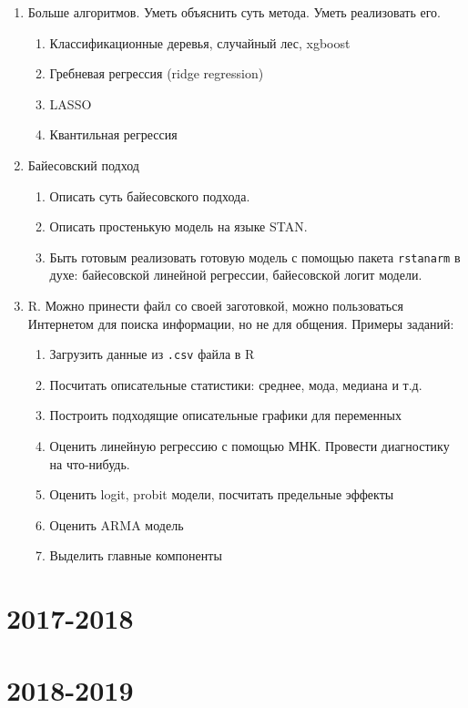 \documentclass[12pt, a4paper]{article}
\theoremstyle{definition}
\begin{document}
\begin{enumerate}
\item Больше алгоритмов. Уметь объяснить суть метода. Уметь реализовать его. %
\begin{enumerate}
\item Классификационные деревья, случайный лес, xgboost
\item Гребневая регрессия (ridge regression)
\item LASSO
\item Квантильная регрессия
\end{enumerate}

\item Байесовский подход
\begin{enumerate}
\item Описать суть байесовского подхода.
\item Описать простенькую модель на языке STAN.
\item Быть готовым реализовать готовую модель с помощью пакета \verb|rstanarm| в духе: байесовской линейной регрессии, байесовской логит модели.
\end{enumerate}

\item R. Можно принести файл со своей заготовкой, можно пользоваться Интернетом для поиска информации, но не для общения. Примеры заданий:
\begin{enumerate}
\item Загрузить данные из \verb|.csv| файла в R
\item Посчитать описательные статистики: среднее, мода, медиана и т.д.
\item Построить подходящие описательные графики для переменных
\item Оценить линейную регрессию с помощью МНК. Провести диагностику на что-нибудь.
\item Оценить logit, probit модели, посчитать предельные эффекты
\item Оценить ARMA модель
\item Выделить главные компоненты
\end{enumerate}


\end{enumerate}

 
\section{2017-2018}



\section{2018-2019}


\end{document}

